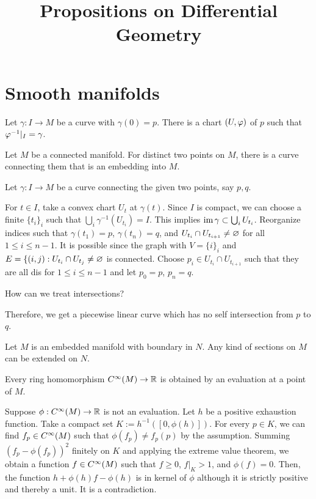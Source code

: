 \documentclass{../exp}
\title{Propositions on Differential Geometry}
\begin{document}
\maketitle
\tableofcontents


\section{Smooth manifolds}

\begin{prop}
Let $\gamma:I\to M$ be a curve with $\gamma(0)=p$.
There is a chart $(U,\varphi)$ of $p$ such that $\varphi^{-1}|_I=\gamma$.
\end{prop}

\begin{prop}
Let $M$ be a connected manifold.
For distinct two points on $M$, there is a curve connecting them that is an embedding into $M$.
\end{prop}
\begin{pf}
Let $\gamma:I\to M$ be a curve connecting the given two points, say $p,q$.

For $t\in I$, take a convex chart $U_t$ at $\gamma(t)$.
Since $I$ is compact, we can choose a finite $\{t_i\}_i$ such that $\bigcup_i\gamma^{-1}(U_{t_i})=I$.
This implies $\operatorname{im}\gamma\subset\bigcup_iU_{t_i}$.
Reorganize indices such that $\gamma(t_1)=p$, $\gamma(t_n)=q$, and $U_{t_i}\cap U_{t_{i+1}}\ne\varnothing$ for all $1\le i\le n-1$.
It is possible since the graph with $V=\{i\}_i$ and $E=\{(i,j):U_{t_i}\cap U_{t_j}\ne\varnothing$ is connected.
Choose $p_i\in U_{t_i}\cap U_{t_{i+1}}$ such that they are all dis for $1\le i\le n-1$ and let $p_0=p$, $p_n=q$.

How can we treat intersections?

Therefore, we get a piecewise linear curve which has no self intersection from $p$ to $q$.

\end{pf}


\begin{prop}
Let $M$ is an embedded manifold with boundary in $N$.
Any kind of sections on $M$ can be extended on $N$.
\end{prop}



\begin{prop}
Every ring homomorphism $C^\oo(M)\to\R$ is obtained by an evaluation at a point of $M$.
\end{prop}
\begin{pf}
Suppose $\phi:C^\oo(M)\to\R$ is not an evaluation.
Let $h$ be a positive exhaustion function.
Take a compact set $K:=h^{-1}([0,\phi(h)])$.
For every $p\in K$, we can find $f_p\in C^\infty(M)$ such that $\phi(f_p)\ne f_p(p)$ by the assumption.
Summing $(f_p-\phi(f_p))^2$ finitely on $K$ and applying the extreme value theorem, we obtain a function $f\in C^\infty(M)$ such that $f\ge0$, $f|_K>1$, and $\phi(f)=0$.
Then, the function $h+\phi(h)f-\phi(h)$ is in kernel of $\phi$ although it is strictly positive and thereby a unit.
It is a contradiction.
\end{pf}
\end{document}
